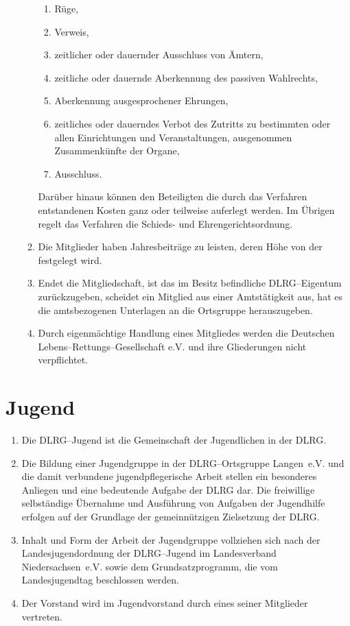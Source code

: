 \documentclass[%
12pt, %
a4paper, %
headsepline, %
parskip, %
headings=normal, %
]{scrreprt}
\begin{document}
\begin{enumerate}
\begin{enumerate}[noitemsep]
\begin{enumerate}
            \item Rüge,
            \item Verweis,
            \item zeitlicher oder dauernder Ausschluss von Ämtern,
            \item zeitliche oder dauernde Aberkennung des passiven Wahlrechts,
            \item Aberkennung ausgesprochener Ehrungen,
            \item zeitliches oder dauerndes Verbot des Zutritts zu bestimmten oder allen Einrichtungen und Veranstaltungen, ausgenommen Zusammenkünfte der Organe,
            \item Ausschluss.
        \end{enumerate}
        Darüber hinaus können den Beteiligten die durch das Verfahren entstandenen Kosten ganz oder teilweise auferlegt werden. Im Übrigen regelt das Verfahren die Schieds- und Ehrengerichtsordnung.
        \item Die Mitglieder haben Jahresbeiträge zu leisten, deren Höhe von der  festgelegt wird. 
        \item Endet die Mitgliedschaft, ist das im Besitz befindliche DLRG--Eigentum zurückzugeben, scheidet ein Mitglied aus einer Amtstätigkeit aus, hat es die amtsbezogenen Unterlagen an die Ortsgruppe herauszugeben.
        \item Durch eigenmächtige Handlung eines Mitgliedes werden die Deutschen Lebens--Rettungs--Gesellschaft e.V. und ihre Gliederungen nicht verpflichtet.

    \end{enumerate}
\end{enumerate}

\section{Jugend}
\label{sec:jugend}
\begin{enumerate}
    \item Die DLRG--Jugend ist die Gemeinschaft der Jugendlichen in der DLRG.
    \item Die Bildung einer Jugendgruppe in der DLRG--Ortsgruppe Langen~e.V. und die damit verbundene jugendpflegerische Arbeit stellen ein besonderes Anliegen und eine bedeutende Aufgabe der DLRG dar. Die freiwillige selbständige Übernahme und Ausführung von Aufgaben der Jugendhilfe erfolgen auf der Grundlage der gemeinnützigen Zielsetzung der DLRG.
    \item Inhalt und Form der Arbeit der Jugendgruppe vollziehen sich nach der Landesjugendordnung der DLRG--Jugend im Landesverband Niedersachsen~e.V. sowie dem Grundsatzprogramm, die vom Landesjugendtag beschlossen werden.
    \item Der Vorstand wird im Jugendvorstand durch eines seiner Mitglieder vertreten.
\end{enumerate}
\end{document}

